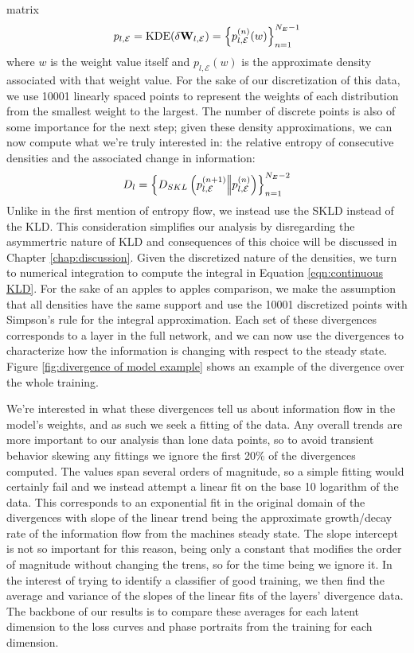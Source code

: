 matrix
\begin{equation}
    p_{l,\mathcal{E}} = \text{KDE}(\delta{\bf W}_{l, \mathcal{E}}) = \left\{p_{l,\mathcal{E}}^{(n)}(w)\right\}_{n=1}^{N_E-1}
\end{equation}
where $w$ is the weight value itself and $p_{l,\mathcal{E}}(w)$ is the approximate density associated 
with that weight value. For the sake of our discretization of this data, we use 10001 linearly spaced 
points to represent the weights of each distribution from the smallest weight to the largest. The number 
of discrete points is also of some importance for the next step; given these density approximations, we 
can now compute what we're truly interested in: the relative entropy of consecutive densities and the 
associated change in information:
\begin{equation}
    D_l = \left\{D_{SKL}\left(p_{l,\mathcal{E}}^{(n+1)} \Big|\!\Big| p_{l,\mathcal{E}}^{(n)}\right)\right\}_{n=1}^{N_E-2}
\end{equation}
Unlike in the first mention of entropy flow, we instead use the SKLD instead of the KLD. This consideration
simplifies our analysis by disregarding the asymmertric nature of KLD and consequences of this choice 
will be discussed in Chapter \ref{chap:discussion}. Given the discretized nature of the densities, we turn 
to numerical integration to compute the integral in Equation \ref{eqn:continuous KLD}. For the sake of an 
apples to apples comparison, we make the assumption that all densities have the same support
and use the 10001 discretized points with Simpson's rule for the integral approximation. Each set of these
divergences corresponds to a layer in the full network, and we can now use the divergences to characterize
how the information is changing with respect to the steady state. Figure \ref{fig:divergence of model example}
shows an example of the divergence over the whole training. 

We're interested in what these divergences tell 
us about information flow in the model's weights, and as such we seek a fitting of the data. Any overall trends
are more important to our analysis than lone data points, so to avoid transient behavior skewing any fittings
we ignore the first 20\% of the divergences computed. The values span several orders of magnitude, so a simple 
fitting would certainly fail and we instead attempt a linear fit on the base 10 logarithm of the data. This 
corresponds to an exponential fit in the original domain of the divergences with slope of the linear trend 
being the approximate growth/decay rate of the information flow from the machines steady state. The slope 
intercept is not so important for this reason, being only a constant that modifies the order of magnitude 
without changing the trens, so for the time being we ignore it. In the interest of trying to identify a 
classifier of good training, we then find the average and variance of the slopes of the linear fits of 
the layers' divergence data. The backbone of our results is to compare these averages for each latent 
dimension to the loss curves and phase portraits from the training for each dimension.

